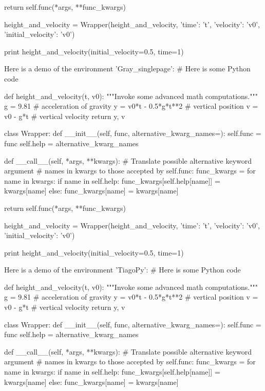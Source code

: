         return self.func(*args, **func_kwargs)

height_and_velocity = Wrapper(height_and_velocity,
                              {'time': 't',
                               'velocity': 'v0',
                               'initial_velocity': 'v0'})

print height_and_velocity(initial_velocity=0.5, time=1)


\noindent
Here is a demo of the environment 'Gray\_singlepage':
# Here is some Python code

def height_and_velocity(t, v0):
    """Invoke some advanced math computations."""
    g = 9.81                  # acceleration of gravity
    y = v0*t - 0.5*g*t**2     # vertical position
    v = v0 - g*t              # vertical velocity
    return y, v

class Wrapper:
    def __init__(self, func, alternative_kwarg_names={}):
        self.func = func
        self.help = alternative_kwarg_names

    def __call__(self, *args, **kwargs):
        # Translate possible alternative keyword argument
        # names in kwargs to those accepted by self.func:
        func_kwargs = {}
        for name in kwargs:
            if name in self.help:
                func_kwargs[self.help[name]] = kwargs[name]
            else:
                func_kwargs[name] = kwargs[name]

        return self.func(*args, **func_kwargs)

height_and_velocity = Wrapper(height_and_velocity,
                              {'time': 't',
                               'velocity': 'v0',
                               'initial_velocity': 'v0'})

print height_and_velocity(initial_velocity=0.5, time=1)


\noindent
Here is a demo of the environment 'TiagoPy':
# Here is some Python code

def height_and_velocity(t, v0):
    """Invoke some advanced math computations."""
    g = 9.81                  # acceleration of gravity
    y = v0*t - 0.5*g*t**2     # vertical position
    v = v0 - g*t              # vertical velocity
    return y, v

class Wrapper:
    def __init__(self, func, alternative_kwarg_names={}):
        self.func = func
        self.help = alternative_kwarg_names

    def __call__(self, *args, **kwargs):
        # Translate possible alternative keyword argument
        # names in kwargs to those accepted by self.func:
        func_kwargs = {}
        for name in kwargs:
            if name in self.help:
                func_kwargs[self.help[name]] = kwargs[name]
            else:
                func_kwargs[name] = kwargs[name]


